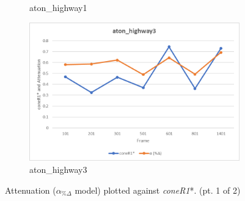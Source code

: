 \begin{appendices}
\begin{figure}
\begin{subfigure}{.45\linewidth}
  \caption{aton\_highway1}
\end{subfigure}
\hfill
\begin{subfigure}{.45\linewidth}
  \includegraphics[width=1\linewidth]{figures/appendix/highway3_rgb.jpg}
  \caption{aton\_highway3}
\end{subfigure}
\caption{Attenuation ($\alpha_{\%\Delta}$ model) plotted against \textit{coneR1}*. (pt. 1 of 2)}

\end{figure}

\begin{figure}


\end{figure}
\end{appendices}
